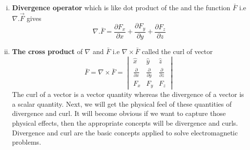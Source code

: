 \begin{enumerate}[(i)]
\item \textbf{Divergence operator} which is like dot product of the  and the function $\bar{F}$ i.e $\nabla.\overrightarrow{F}$ gives
\begin{equation}
\nabla.\bar{F} = \frac{\partial F_{x}}{\partial x} + \frac{\partial F_{y}}{\partial y} + \frac{\partial F_{z}}{\partial z}
\end{equation}
\item \textbf{The cross product} of $\nabla$ and $\bar{F}$ i.e $\nabla \times \bar{F}$ called the curl of vector
\begin{dmath*}
\bar{F} = \nabla \times \bar{F} = 
\begin{vmatrix}
\hat{x} & \hat{y} & \hat{z}\\
\frac{\partial}{\partial x} & \frac{\partial}{\partial y} & \frac{\partial}{\partial z}\\
F_{x} & F_{y} & F_{z}
\end{vmatrix}
\end{dmath*}
The curl of a vector is a vector quantity whereas the divergence of a vector is a scalar quantity. Next, we will get the physical feel of these quantities of divergence and curl. It will become obvious if we want to capture those physical effects, then the appropriate concepts will be divergence and curls. Divergence and curl are the basic concepts applied to solve electromagnetic problems.
\end{enumerate}

